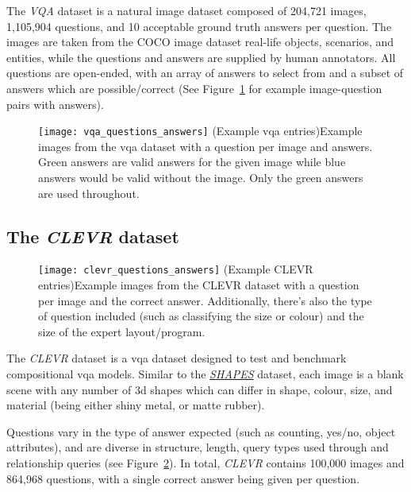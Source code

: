 The \textit{VQA} dataset \cite{agrawal_vqa_2016} is a natural image dataset composed of 204,721 images, 1,105,904 questions, and 10 acceptable ground truth answers per question.
The images are taken from the COCO image dataset \cite{lin_microsoft_2015} real-life objects, scenarios, and entities, while the questions and answers are supplied by human annotators.
All questions are open-ended, with an array of answers to select from and a subset of answers which are possible/correct (See Figure~\ref{fig:vqa_questions_answers} for example image-question pairs with answers).

\begin{figure}[htbp]
    \centering
    \texttt{[image: vqa\_questions\_answers]}
    \captionsource(Example \acrshort{vqa} entries){Example images from the \acrshort{vqa} dataset with a question per image and answers. Green answers are valid answers for the given image while blue answers would be valid without the image. Only the green answers are used throughout. \label{fig:vqa_questions_answers}}{\citeauthor{agrawal_vqa_2016}\cite{agrawal_vqa_2016}}
\end{figure}

\subsection{The \textit{CLEVR} dataset}
\label{subsec:clevr_dataset}

\begin{figure}[htbp]
    \centering
    \texttt{[image: clevr\_questions\_answers]}
    \captionsource(Example CLEVR entries){Example images from the CLEVR dataset with a question per image and the correct answer. Additionally, there's also the type of question included (such as classifying the size or colour) and the size of the expert layout/program. \label{fig:clevr_questions_answers}}{\citeauthor{johnson_clevr_2016}\cite{johnson_clevr_2016}}
\end{figure}

The \textit{CLEVR} dataset \cite{johnson_clevr_2016} is a \gls{vqa} dataset designed to test and benchmark compositional \gls{vqa} models.
Similar to the \textit{\hyperref[subsec:shapes_dataset]{SHAPES}} dataset, each image is a blank scene with any number of 3d shapes which can differ in shape, colour, size, and material (being either shiny metal, or matte rubber).

Questions vary in the type of answer expected (such as counting, yes/no, object attributes), and are diverse in structure, length, query types used through and relationship queries (see Figure~\ref{fig:clevr_questions_answers}).
In total, \textit{CLEVR} contains 100,000 images and 864,968 questions, with a single correct answer being given per question.

